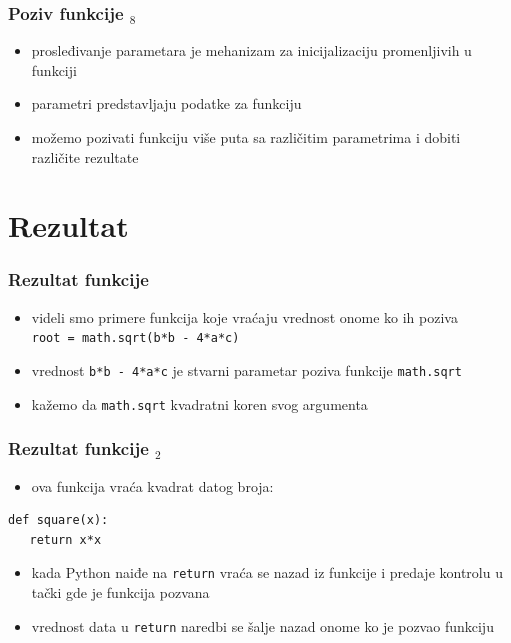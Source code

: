 \documentclass[utf8,compress]{beamer}
\begin{document}
\begin{frame}[fragile]
  \frametitle{Poziv funkcije $_8$}
  \begin{itemize}
    \item prosleđivanje parametara je mehanizam za inicijalizaciju promenljivih u funkciji
    \item parametri predstavljaju  podatke za funkciju
    \item možemo pozivati funkciju više puta sa različitim parametrima i dobiti različite rezultate
  \end{itemize}
\end{frame}

\section{Rezultat}

\begin{frame}[fragile]
  \frametitle{Rezultat funkcije}
  \begin{itemize}
    \item videli smo primere funkcija koje vraćaju vrednost onome ko ih poziva \\
      \texttt{root = math.sqrt(b*b - 4*a*c)}
    \item vrednost \texttt{b*b - 4*a*c} je stvarni parametar poziva funkcije \texttt{math.sqrt}
    \item kažemo da \texttt{math.sqrt}  kvadratni koren svog argumenta
  \end{itemize}
\end{frame}

\begin{frame}[fragile]
  \frametitle{Rezultat funkcije $_2$}
  \begin{itemize}
    \item ova funkcija vraća kvadrat datog broja: \\
  \end{itemize}
\begin{verbatim}
def square(x):
   return x*x
\end{verbatim}
  \begin{itemize}
    \item kada Python naiđe na \texttt{return} vraća se nazad iz funkcije i predaje kontrolu u tački gde je funkcija pozvana
    \item vrednost data u \texttt{return} naredbi se šalje nazad onome ko je pozvao funkciju
  \end{itemize}
\end{frame}
\end{document}
